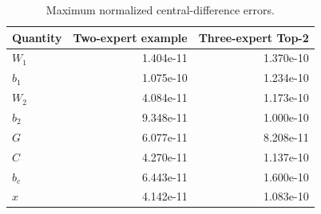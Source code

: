 \begin{table}[ht]
\centering
\small
\caption{Maximum normalized central-difference errors.}
\label{tab:numpy-gradients}
\begin{tabular}{lrr}
\toprule
Quantity & Two-expert example & Three-expert Top-2 \\
\midrule
$W_1$ & 1.404e-11 & 1.370e-10 \\
$b_1$ & 1.075e-10 & 1.234e-10 \\
$W_2$ & 4.084e-11 & 1.173e-10 \\
$b_2$ & 9.348e-11 & 1.000e-10 \\
$G$ & 6.077e-11 & 8.208e-11 \\
$C$ & 4.270e-11 & 1.137e-10 \\
$b_c$ & 6.443e-11 & 1.600e-10 \\
$x$ & 4.142e-11 & 1.083e-10 \\
\bottomrule
\end{tabular}
\end{table}
